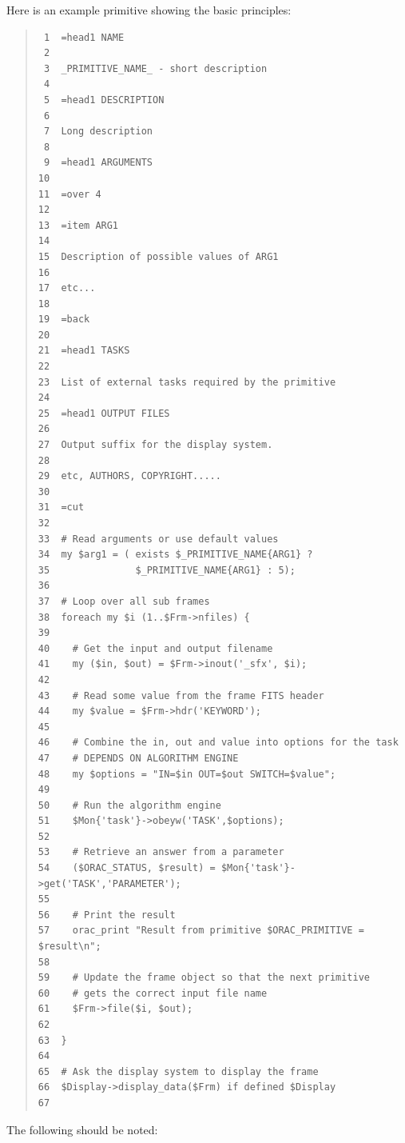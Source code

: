 \documentclass[twoside,11pt]{article}
\renewcommand{\_}{\texttt{\symbol{95}}}
\newenvironment{myquote}{\begin{quote}\begin{small}}{\end{small}\end{quote}}
\begin{document}
Here is an example primitive showing the basic principles:

\begin{myquote}
\begin{verbatim}
 1  =head1 NAME
 2
 3  _PRIMITIVE_NAME_ - short description
 4
 5  =head1 DESCRIPTION
 6 
 7  Long description
 8
 9  =head1 ARGUMENTS
10
11  =over 4
12
13  =item ARG1
14
15  Description of possible values of ARG1
16
17  etc...
18
19  =back
20
21  =head1 TASKS
22
23  List of external tasks required by the primitive
24
25  =head1 OUTPUT FILES
26
27  Output suffix for the display system.
28
29  etc, AUTHORS, COPYRIGHT.....
30
31  =cut
32
33  # Read arguments or use default values
34  my $arg1 = ( exists $_PRIMITIVE_NAME{ARG1} ? 
35               $_PRIMITIVE_NAME{ARG1} : 5);
36
37  # Loop over all sub frames
38  foreach my $i (1..$Frm->nfiles) {
39
40    # Get the input and output filename
41    my ($in, $out) = $Frm->inout('_sfx', $i);
42
43    # Read some value from the frame FITS header
44    my $value = $Frm->hdr('KEYWORD');
45
46    # Combine the in, out and value into options for the task
47    # DEPENDS ON ALGORITHM ENGINE
48    my $options = "IN=$in OUT=$out SWITCH=$value";
49
50    # Run the algorithm engine
51    $Mon{'task'}->obeyw('TASK',$options);
52
53    # Retrieve an answer from a parameter
54    ($ORAC_STATUS, $result) = $Mon{'task'}->get('TASK','PARAMETER');
55
56    # Print the result
57    orac_print "Result from primitive $ORAC_PRIMITIVE = $result\n";
58
59    # Update the frame object so that the next primitive
60    # gets the correct input file name
61    $Frm->file($i, $out);
62
63  }
64
65  # Ask the display system to display the frame
66  $Display->display_data($Frm) if defined $Display
67
\end{verbatim}
\end{myquote} %
The following should be noted:
\end{document}
